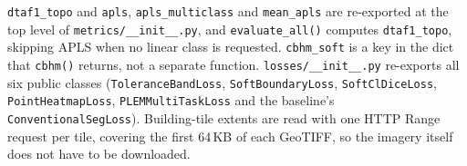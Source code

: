 \texttt{dtaf1\_topo} and \texttt{apls}, \texttt{apls\_multiclass} and \texttt{mean\_apls} are
re-exported at the top level of \texttt{metrics/\_\_init\_\_.py}, and \texttt{evaluate\_all()}
computes \texttt{dtaf1\_topo}, skipping APLS when no linear class is requested.
\texttt{cbhm\_soft} is a key in the dict that \texttt{cbhm()} returns, not a separate function.
\texttt{losses/\_\_init\_\_.py} re-exports all six public classes (\texttt{ToleranceBandLoss},
\texttt{SoftBoundaryLoss}, \texttt{SoftClDiceLoss}, \texttt{PointHeatmapLoss},
\texttt{PLEMMultiTaskLoss} and the baseline's \texttt{ConventionalSegLoss}). Building-tile extents are read with one HTTP Range request per tile,
covering the first 64\,KB of each GeoTIFF, so the imagery itself does not have to be downloaded.
